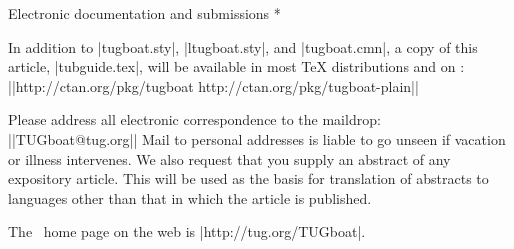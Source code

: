 \head * Electronic documentation and submissions *

In addition to |tugboat.sty|, |ltugboat.sty|, and |tugboat.cmn|,
a copy of this article, |tubguide.tex|, will be available in
most \TeX{} distributions and on \CTAN:
||http://ctan.org/pkg/tugboat
http://ctan.org/pkg/tugboat-plain||

Please address all electronic correspondence to the \TUB{} maildrop:
||TUGboat@tug.org||
Mail to personal addresses is liable to go unseen if
vacation or illness intervenes.  We also request that you supply
an abstract of any expository article.  This will be used as the
basis for translation of abstracts to languages other than that
in which the article is published.

\smallskip
The \TUB\ home page on the web is |http://tug.org/TUGboat|.

\makesignature

\endarticle

